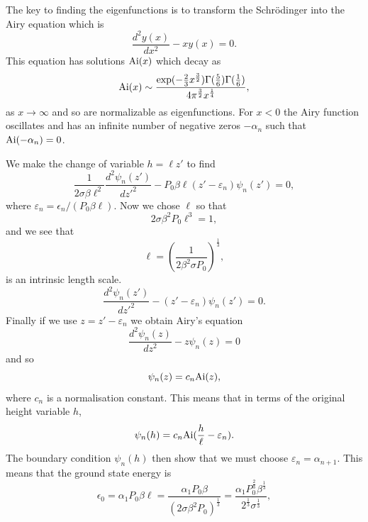 The key to finding the eigenfunctions is to transform  the Schr\"odinger into the Airy equation which is
\begin{equation}
\frac{d^2y(x)}{dx^2}- x y(x)=0.
\end{equation}
This equation has solutions ${\rm Ai}(x)$ which decay as 
\begin{equation}
{\rm Ai}(x) \sim \frac{\exp(-\frac{2}{3} x^{\frac{3}{2}}) \Gamma(\frac{5}{6})\Gamma(\frac{1}{6})}{4\pi^{\frac{3}{2}} x^{\frac{1}{4}}},
\end{equation}
as $x\to\infty$ and so are normalizable as eigenfunctions. For $x<0$ the Airy function  oscillates and has an 
infinite number of negative zeros $-\alpha_n$ such that ${\rm Ai}(-\alpha_n)=0$. 

We make the change of variable $h=\ell z'$ to find
\begin{equation}
\frac{1}{2\sigma\beta\ell^2}\frac{d^2 \psi_n(z')}{dz'^2}- P_0\beta \ell(z'-\varepsilon_n)\psi_n(z')=0,
\end{equation}
where $\varepsilon_n= \epsilon_n/(P_0\beta\ell)$. Now  we chose $\ell$ so that
\begin{equation}
2\sigma\beta^2P_0 \ell^3=1,
\end{equation}
and we see that  
\begin{equation}
\ell = \left(\frac{1}{2\beta^2\sigma P_0}\right)^{\frac{1}{3}},
\end{equation}
is an intrinsic length scale.
\begin{equation}
\frac{d^2 \psi_n(z')}{dz'^2}- (z'-\varepsilon_n)\psi_n(z')=0.
\end{equation}
Finally if we use $z=z'-\varepsilon_n$ we obtain Airy's equation \cite{albright_integrals_1977}
\begin{equation}
\frac{d^2 \psi_n(z)}{dz^2}- z\psi_n(z)=0
\end{equation}
and so
\begin{equation}
\psi_n(z)= c_n {\rm Ai}(z),
\end{equation}
where $c_n$ is a normalisation constant. This means that in terms of the original height variable $h$, 
\begin{equation}
\psi_n(h)= c_n {\rm Ai}(\frac{h}{\ell}-\varepsilon_n).
\end{equation}
The boundary condition $\psi_n(h)$ then show that we must choose $\varepsilon_n=\alpha_{n+1}$. This means that the ground state energy is
\begin{equation}
\epsilon_0 = \alpha_1P_0\beta\ell= \frac{\alpha_1P_0\beta}{(2\sigma\beta^2P_0)^\frac{1}{3}}= \frac{\alpha_1 P_0^\frac{2}{3}\beta^\frac{1}{3}}{2^\frac{1}{3} \sigma^\frac{1}{3}},
\end{equation}
